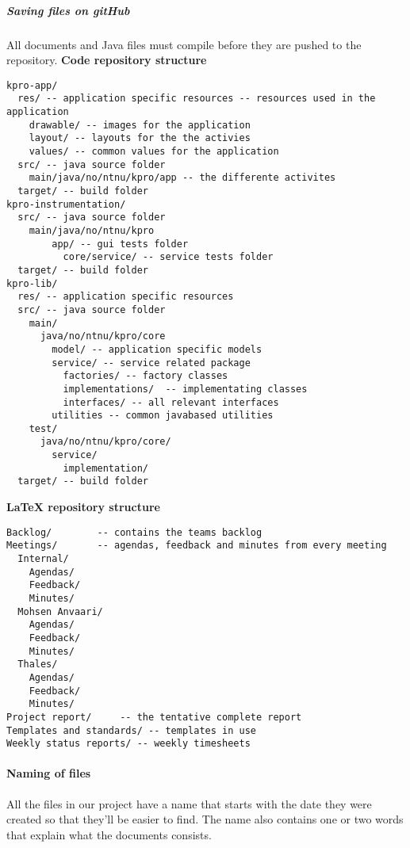 \subparagraph{Saving files on gitHub}\hfill
\newline
All documents and Java files must compile before they are pushed to the repository.
\newline
\newline
\textbf{Code repository structure}
\begin{verbatim}
kpro-app/
  res/ -- application specific resources -- resources used in the application
    drawable/ -- images for the application
    layout/ -- layouts for the the activies
    values/ -- common values for the application
  src/ -- java source folder
    main/java/no/ntnu/kpro/app -- the differente activites
  target/ -- build folder
kpro-instrumentation/
  src/ -- java source folder
    main/java/no/ntnu/kpro
	    app/ -- gui tests folder
		  core/service/ -- service tests folder
  target/ -- build folder
kpro-lib/
  res/ -- application specific resources
  src/ -- java source folder
    main/
      java/no/ntnu/kpro/core
        model/ -- application specific models
        service/ -- service related package
          factories/ -- factory classes
          implementations/  -- implementating classes
          interfaces/ -- all relevant interfaces
        utilities -- common javabased utilities
    test/
      java/no/ntnu/kpro/core/
        service/
          implementation/
  target/ -- build folder
\end{verbatim}

\newpage

\textbf{LaTeX repository structure}
\begin{verbatim}
Backlog/		-- contains the teams backlog
Meetings/		-- agendas, feedback and minutes from every meeting
  Internal/
    Agendas/
    Feedback/
    Minutes/
  Mohsen Anvaari/
    Agendas/
    Feedback/
    Minutes/
  Thales/
    Agendas/
    Feedback/
    Minutes/
Project report/		-- the tentative complete report
Templates and standards/ -- templates in use
Weekly status reports/ -- weekly timesheets

\end{verbatim}

\paragraph{Naming of files}\hfill
\newline
All the files in our project have a name that starts with the date they were created so that they’ll be easier to find. The name also contains one or two words that explain what the documents consists.

